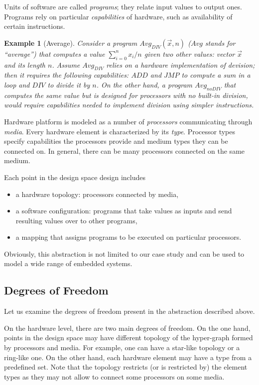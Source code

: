 \documentclass[conference]{IEEEtran}
\newtheorem{exmp}{Example}[section]
\begin{document}
Units of software are called \emph{programs}; they relate input values to output ones. Programs rely on particular \emph{capabilities} of hardware, such as availability of certain instructions.

\begin{exmp}[Average] Consider a program $Avg_{DIV}(\overrightarrow{x}, n)$ ($Avg$ stands for ``average'') that computes a value $\sum\limits_{i=0}^n x_i / n$ given two other values: vector $\overrightarrow{x}$ and its length $n$. Assume $Avg_{DIV}$ relies on a hardware implementation of devision; then it requires the following capabilities: $ADD$ and $JMP$ to compute a sum in a loop and $DIV$ to divide it by $n$. On the other hand, a program $Avg_{noDIV}$ that computes the same value but is designed for processors with no built-in division, would require capabilities needed to implement division using simpler instructions.
\end{exmp}

Hardware platform is modeled as a number of \emph{processors} communicating through \emph{media}. Every hardware element is characterized by its \emph{type}. Processor types specify capabilities the processors provide and medium types they can be connected on. In general, there can be many processors connected on the same medium.

Each point in the design space design includes 
\begin{itemize}
\item a hardware topology: processors connected by media,
\item a software configuration: programs that take values as inputs and send resulting values over to other programs,
\item a mapping that assigns programs to be executed on particular processors.
\end{itemize}
Obviously, this abstraction is not limited to our case study and can be used to model a wide range of embedded systems.

\subsection{Degrees of Freedom}

Let us examine the degrees of freedom present in the abstraction described above.

On the hardware level, there are two main degrees of freedom. On the one hand, points in the design space may have different topology of the hyper-graph formed by processors and media. For example, one can have a star-like topology or a ring-like one. On the other hand, each hardware element may have a type from a predefined set. Note that the topology restricts (or is restricted by) the element types as they may not allow to connect some processors on some media.
\end{document}
